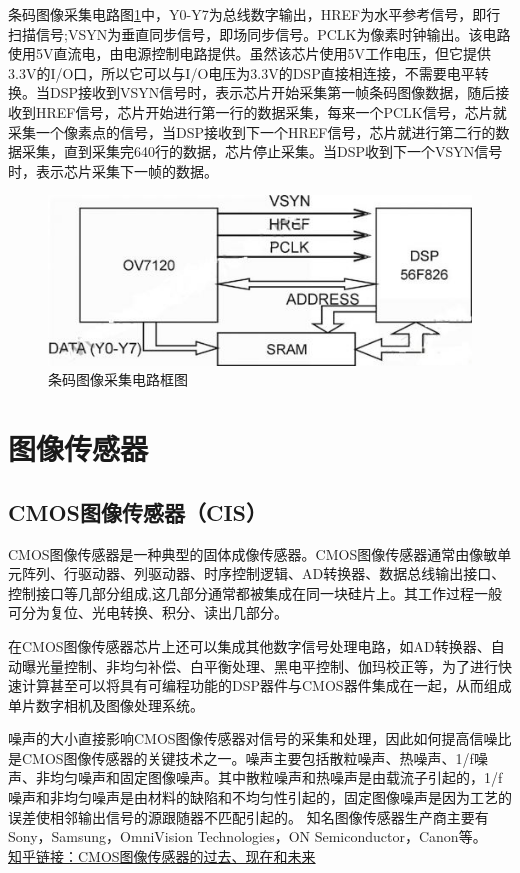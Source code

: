 \documentclass[a4paper,11pt]{article}
\begin{document}
条码图像采集电路图\ref{fig:part1}中，Y0-Y7为总线数字输出，HREF为水平参考信号，即行扫描信号;VSYN为垂直同步信号，即场同步信号。PCLK为像素时钟输出。该电路使用5V直流电，由电源控制电路提供。虽然该芯片使用5V工作电压，但它提供3.3V的I/O口，所以它可以与I/O电压为3.3V的DSP直接相连接，不需要电平转换。当DSP接收到VSYN信号时，表示芯片开始采集第一帧条码图像数据，随后接收到HREF信号，芯片开始进行第一行的数据采集，每来一个PCLK信号，芯片就采集一个像素点的信号，当DSP接收到下一个HREF信号，芯片就进行第二行的数据采集，直到采集完640行的数据，芯片停止采集。当DSP收到下一个VSYN信号时，表示芯片采集下一帧的数据。
	\begin{figure}
               \begin{center}
               \includegraphics[scale=0.5]{part1.jpg}
               \caption{条码图像采集电路框图}
               \label{fig:part1}
               \end{center}
         \end{figure}

\section{图像传感器}
\subsection{CMOS图像传感器（CIS）}
CMOS图像传感器是一种典型的固体成像传感器。CMOS图像传感器通常由像敏单元阵列、行驱动器、列驱动器、时序控制逻辑、AD转换器、数据总线输出接口、控制接口等几部分组成,这几部分通常都被集成在同一块硅片上。其工作过程一般可分为复位、光电转换、积分、读出几部分。

在CMOS图像传感器芯片上还可以集成其他数字信号处理电路，如AD转换器、自动曝光量控制、非均匀补偿、白平衡处理、黑电平控制、伽玛校正等，为了进行快速计算甚至可以将具有可编程功能的DSP器件与CMOS器件集成在一起，从而组成单片数字相机及图像处理系统。

噪声的大小直接影响CMOS图像传感器对信号的采集和处理，因此如何提高信噪比是CMOS图像传感器的关键技术之一。噪声主要包括散粒噪声、热噪声、1/f噪声、非均匀噪声和固定图像噪声。其中散粒噪声和热噪声是由载流子引起的，1/f噪声和非均匀噪声是由材料的缺陷和不均匀性引起的，固定图像噪声是因为工艺的误差使相邻输出信号的源跟随器不匹配引起的。
 知名图像传感器生产商主要有Sony，Samsung，OmniVision Technologies，ON Semiconductor，Canon等。\\
 \href{https://zhuanlan.zhihu.com/p/27463125}{知乎链接：CMOS图像传感器的过去、现在和未来}  
\end{document}
